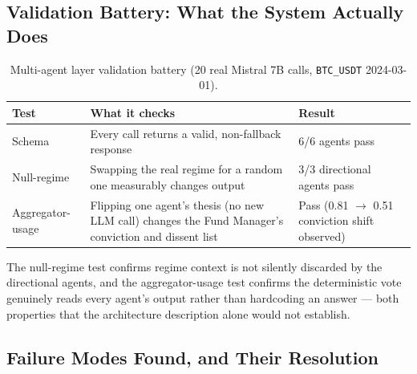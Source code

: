 \subsection{Validation Battery: What the System Actually Does}
\label{subsec:agent-validation-battery}

\begin{table}[H]
\centering
\small
\setlength{\tabcolsep}{4.5pt}
\renewcommand{\arraystretch}{1.3}
\caption{Multi-agent layer validation battery (20 real Mistral 7B calls, \texttt{BTC\_USDT} 2024-03-01).}
\label{tab:agent-validation-battery}
\begin{tabular}{|p{3.2cm}|p{6.0cm}|p{3.3cm}|}
\hline
\textbf{Test} & \textbf{What it checks} & \textbf{Result} \\
\hline
Schema & Every call returns a valid, non-fallback response & 6/6 agents pass \\
\hline
Null-regime & Swapping the real regime for a random one measurably changes output & 3/3 directional agents pass \\
\hline
Aggregator-usage & Flipping one agent's thesis (no new LLM call) changes the Fund Manager's conviction and dissent list & Pass (0.81 $\to$ 0.51 conviction shift observed) \\
\hline
\end{tabular}
\renewcommand{\arraystretch}{1.0}
\normalsize
\end{table}

The null-regime test confirms regime context is not silently discarded by the directional agents, and the aggregator-usage test confirms the deterministic vote genuinely reads every agent's output rather than hardcoding an answer --- both properties that the architecture description alone would not establish.

\subsection{Failure Modes Found, and Their Resolution}
\label{subsec:agent-failure-modes}

